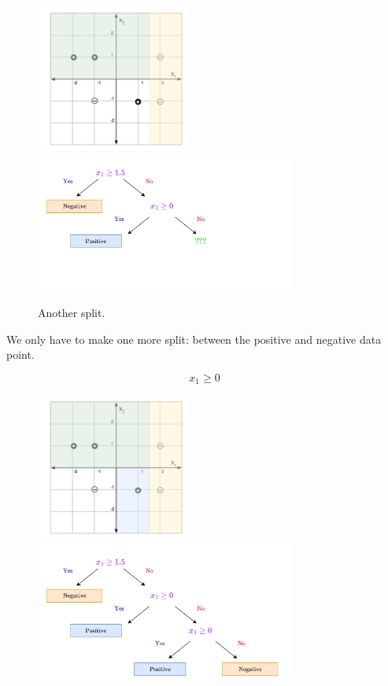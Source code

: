         \begin{figure}[H]
            \centering
            \includegraphics[width=50mm,scale=0.5]{images/nonparametric_images/x2_geq_0.png}
            \includegraphics[width=85mm,scale=0.5]{images/nonparametric_images/x2_geq_0_tree.png}
            \caption*{Another split.}
        \end{figure}

        We only have to make one more split: between the positive and negative data point.

        \begin{equation}
            x_1\geq 0
        \end{equation}
        
        \begin{figure}[H]
            \centering
            \includegraphics[width=50mm,scale=0.5]{images/nonparametric_images/x1_geq_0.png}
            \includegraphics[width=85mm,scale=0.5]{images/nonparametric_images/x1_geq_0_tree.png}
        \end{figure}

